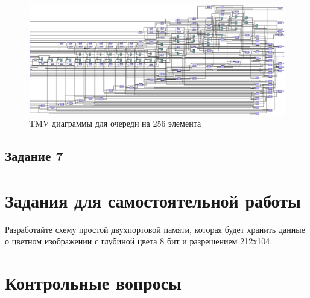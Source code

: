\documentclass[a4paper,14pt]{article}
\begin{document}
		\begin{figure}[H]
			\centering
			\includegraphics[width=0.5\linewidth]{images/z6_tmv_256_v2}
			\caption{TMV диаграммы для очереди на 256 элемента}
			\label{fig:z6_tmv_256_v2}
		\end{figure}
	
	\subsection{Задание 7}
	
	
	\section{Задания для самостоятельной работы}
	
	Разработайте схему простой двухпортовой памяти, которая будет хранить данные о
	цветном изображении с глубиной цвета 8 бит и разрешением 212х104.
	
			
	\section{Контрольные вопросы}
	
\end{document}
